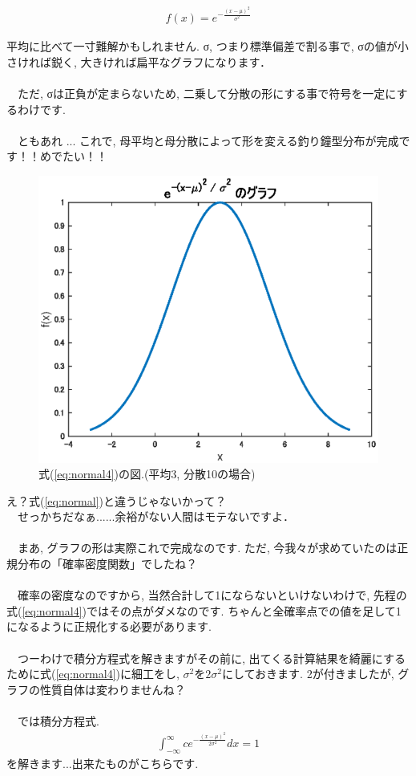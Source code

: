 \documentclass[11pt,a4paper]{ujreport} 	%
\begin{document}
\begin{align}
\label{eq:normal4}
f(x) = e^{-\frac{(x-\mu)^2}{\sigma^2}}
\end{align}

平均に比べて一寸難解かもしれません. σ, つまり標準偏差で割る事で, σの値が小さければ鋭く, 大きければ扁平なグラフになります．\\
\\
　ただ, σは正負が定まらないため, 二乗して分散の形にする事で符号を一定にするわけです. \\
\\
　ともあれ ... これで, 母平均と母分散によって形を変える釣り鐘型分布が完成です！！めでたい！！\\

\begin{figure}[H]
\label{im:normal4}
  \centering
  \includegraphics[width=120mm]{../figures/normal4.eps}
  \caption{式(\ref{eq:normal4})の図.(平均3, 分散10の場合)}
\end{figure}

え？式(\ref{eq:normal})と違うじゃないかって？\\
　せっかちだなぁ......余裕がない人間はモテないですよ．\\
\\
　まあ, グラフの形は実際これで完成なのです. ただ, 今我々が求めていたのは正規分布の「確率密度関数」でしたね？\\
\\
　確率の密度なのですから, 当然合計して1にならないといけないわけで, 先程の式(\ref{eq:normal4})ではその点がダメなのです. ちゃんと全確率点での値を足して1になるように正規化する必要があります.\\
\\
　つーわけで積分方程式を解きますがその前に, 出てくる計算結果を綺麗にするために式(\ref{eq:normal4})に細工をし, $\sigma^2$を$2\sigma^2$にしておきます. 2が付きましたが, グラフの性質自体は変わりませんね？\\
\\
　では積分方程式.
\begin{align}
\int_{-\infty}^{\infty} c e^{-\frac{(x-\mu)^2}{2\sigma^2}} dx= 1
\end{align}
を解きます...出来たものがこちらです.
\end{document}
